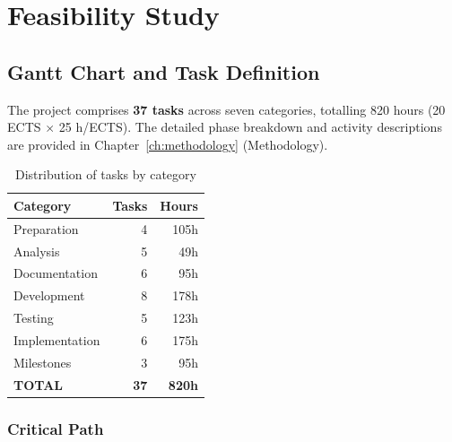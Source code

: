 \chapter{Feasibility Study}
\label{ch:feasibility}

\section{Gantt Chart and Task Definition}

The project comprises \textbf{37 tasks} across seven categories, totalling 820 hours
(20 ECTS $\times$ 25 h/ECTS). The detailed phase breakdown and activity descriptions
are provided in Chapter~\ref{ch:methodology} (Methodology).

\begin{table}[H]
    \centering
    \begin{tabularx}{\textwidth}{Xrr}
\toprule
    \textbf{Category} & \textbf{Tasks} & \textbf{Hours} \\
\midrule
    Preparation      & 4  & 105h \\
    Analysis         & 5  & 49h  \\
    Documentation    & 6  & 95h  \\
    Development      & 8  & 178h \\
    Testing          & 5  & 123h \\
    Implementation   & 6  & 175h \\
    Milestones       & 3  & 95h  \\
    \textbf{TOTAL}   & \textbf{37} & \textbf{820h} \\
\bottomrule
    \end{tabularx}
    \caption{Distribution of tasks by category}
    \label{tab:task_categories}
\end{table}

\subsection{Critical Path}


